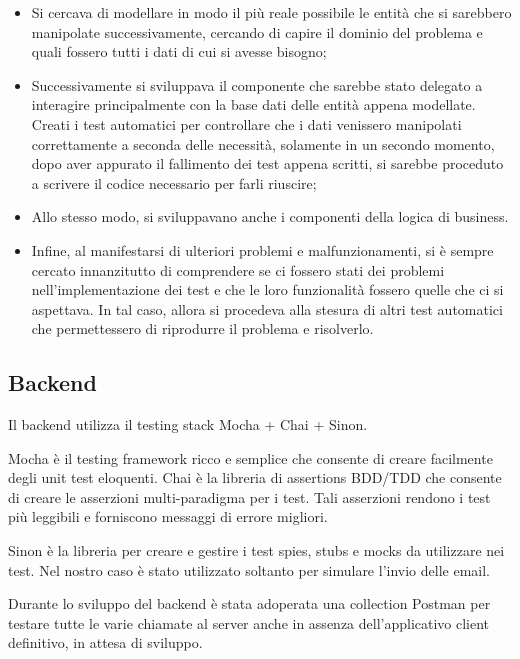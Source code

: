 \begin{itemize}

    \item Si cercava di modellare in modo il più reale possibile le entità che si sarebbero manipolate successivamente, cercando di capire il dominio del problema e quali fossero tutti i dati di cui si avesse bisogno;
    
    \item Successivamente si sviluppava il componente che sarebbe stato delegato a interagire principalmente con la base dati delle entità appena modellate. Creati i test automatici per controllare che i dati venissero manipolati correttamente a seconda delle necessità, solamente in un secondo momento, dopo aver appurato il fallimento dei test appena scritti, si sarebbe proceduto a scrivere il codice necessario per farli riuscire;
    
    \item Allo stesso modo, si sviluppavano anche i componenti della logica di business.
    
    \item Infine, al manifestarsi di ulteriori problemi e malfunzionamenti, si è sempre cercato innanzitutto di comprendere se ci fossero stati dei problemi nell'implementazione dei test e che le loro funzionalità fossero quelle che ci si aspettava. In tal caso, allora si procedeva alla stesura di altri test automatici che permettessero di riprodurre il problema e risolverlo.
    
\end{itemize}

    \subsection{Backend}
    
    Il backend utilizza il testing stack Mocha + Chai + Sinon.
    
    Mocha è il testing framework ricco e semplice che consente di creare facilmente degli unit test eloquenti. Chai è la libreria di assertions BDD/TDD che consente di creare le asserzioni multi-paradigma per i test. Tali asserzioni rendono i test più leggibili e forniscono messaggi di errore migliori. 
    
    Sinon è la libreria per creare e gestire i test spies, stubs e mocks da utilizzare nei test. Nel nostro caso è stato utilizzato soltanto per simulare l'invio delle email.
    
    Durante lo sviluppo del backend è stata adoperata una collection Postman per testare tutte le varie chiamate al server anche in assenza dell'applicativo client definitivo, in attesa di sviluppo. 

